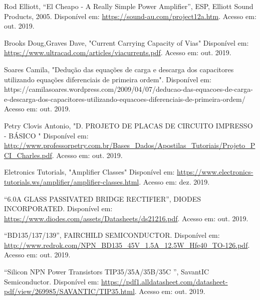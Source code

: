 \documentclass[a4paper,12pt,oneside,openany,table,xcdraw]{article}
\begin{document}
\newpage
\begin{thebibliography}{9} 
    Rod Elliott,
    “El Cheapo - A Really Simple Power Amplifier”, ESP, Elliott Sound Products, 2005.
 Disponível em:
 \url{https://sound-au.com/project12a.htm}. Acesso em: out. 2019.
 
 
    Brooks Doug,Graves Dave,
    "Current Carrying Capacity of Vias"
 Disponível em: 
 \url{https://www.ultracad.com/articles/viacurrents.pdf}. Acesso em: out. 2019.
 
    Soares Camila,
 "Dedução das equações de carga e descarga dos capacitores utilizando equações diferenciais de primeira ordem". 
  Disponível em: 
https://camilasoares.wordpress.com/2009/04/07/deducao-das-equacoes-de-carga-e-descarga-dos-capacitores-utilizando-equacoes-diferenciais-de-primeira-ordem/ 
Acesso em: out. 2019.
 
    Petry Clovis Antonio,
 "D. PROJETO DE PLACAS DE CIRCUITO
IMPRESSO - BÁSICO "
  Disponível em: 
 \url{http://www.professorpetry.com.br/Bases_Dados/Apostilas_Tutoriais/Projeto_PCI_Charles.pdf}. Acesso em: out. 2019.
 
    Eletronics Tutorials,
 "Amplifier Classes"
  Disponível em: 
 \url{https://www.electronics-tutorials.ws/amplifier/amplifier-classes.html}. Acesso em: dez. 2019.
 
 
        “6.0A GLASS PASSIVATED BRIDGE RECTIFIER”, DIODES INCORPORATED.
 Disponível em:
 \url{https://www.diodes.com/assets/Datasheets/ds21216.pdf}. Acesso em: out. 2019.
 
    “BD135/137/139”, FAIRCHILD SEMICONDUCTOR.
 Disponível em:
 \url{http://www.redrok.com/NPN_BD135_45V_1.5A_12.5W_Hfe40_TO-126.pdf}. Acesso em: out. 2019.
 
    “Silicon NPN Power Transistors TIP35/35A/35B/35C ”, SavantIC Semiconductor. 
 Disponível em:
 \url{https://pdf1.alldatasheet.com/datasheet-pdf/view/269985/SAVANTIC/TIP35.html}. Acesso em: out. 2019.
 
 


\end{thebibliography}
\end{document}

